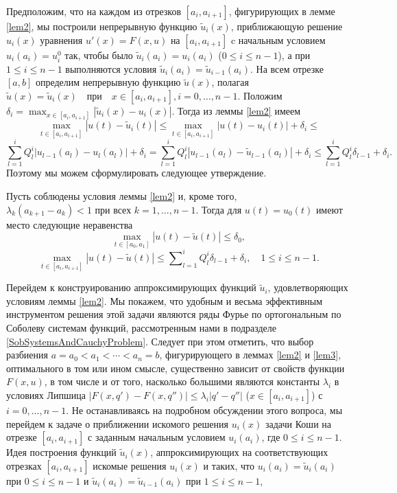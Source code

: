 Предположим, что на каждом из отрезков $[a_i,a_{i+1}]$, фигурирующих в лемме \ref{lem2}, мы построили непрерывную функцию $\tilde u_i(x)$,  приближающую решение $u_i(x)$ уравнения $u'(x)=F(x,u)$   на $[a_i,a_{i+1}]$  c начальным условием  $u_i(a_i)=u_i^0$ так, чтобы  было  $\tilde u_i(a_i)= u_i(a_i)$ ($0\le i\le n-1$), а при $1\le i\le n-1$ выполняются условия $\tilde u_i(a_i)=\tilde u_{i-1}(a_i)$.  На всем отрезке $[a,b]$ определим непрерывную функцию $\tilde u(x)$, полагая
$\tilde u(x)=\tilde u_i(x)\quad \text{при}\quad x\in [a_i,a_{i+1}], i=0,\ldots, n-1$.
Положим $\delta_i=\max_{x\in[a_i,a_{i+1}]}|\tilde u_i(x)- u_i(x)|$. Тогда из леммы \ref{lem2} имеем
$$
\max_{t\in[a_i,a_{i+1}]}|u(t)-\tilde u_i(t)|\le \max_{t\in[a_i,a_{i+1}]}|u(t)- u_i(t)|+\delta_i\le
$$
$$
\sum_{l=1}^{i}Q_{l}^{i}|u_{l-1}(a_{l})-u_{l}(a_l)|+\delta_i=
\sum_{l=1}^{i}Q_{l}^{i}|u_{l-1}(a_{l})-\tilde u_{l-1}(a_{l})| +\delta_i\le
\sum_{l=1}^{i}Q_{l}^{i}\delta_{l-1}+\delta_i.
$$
Поэтому мы можем сформулировать следующее утверждение.
\begin{lemma}\label{lem3}
	Пусть соблюдены условия леммы \ref{lem2}   и, кроме того,\\ $\lambda_{k}(a_{k+1}-a_k)<1$ при всех $k=1,\ldots,n-1$. Тогда для $u(t)=u_0(t)$  имеют место следующие неравенства
	$$
	\max_{t\in[a_0,a_1]}|u(t)-\tilde u(t)|\le \delta_0,
	$$
	$$
	\max_{t\in[a_i,a_{i+1}]}|u(t)-\tilde u(t)|\le\sum\nolimits_{l=1}^iQ_{l}^i\delta_{l-1}+\delta_i, \quad 1\le i\le n-1.
	$$
\end{lemma}
Перейдем к конструированию аппроксимирующих  функций $\tilde u_i$, удовлетворяющих условиям  леммы \ref{lem2}. Мы покажем, что удобным и весьма эффективным инструментом  решения этой задачи являются ряды Фурье по ортогональным по Соболеву системам функций, рассмотренным нами в подразделе \ref{SobSystemsAndCauchyProblem}. Следует при этом отметить, что выбор разбиения $a=a_0<a_1<\cdots<a_n=b$, фигурирующего в леммах \ref{lem2} и \ref{lem3}, оптимального в том или ином смысле, существенно зависит от свойств функции $F(x,u)$, в том числе  и от того, насколько большими являются константы $\lambda_i$ в условиях Липшица $|F(x,q')-F(x,q'')|\le\lambda_i|q'-q''|$ ($x\in [a_i,a_{i+1}]$) с $i=0,\ldots, n-1$. Не останавливаясь на подробном обсуждении этого вопроса, мы перейдем к задаче о приближении  искомого решения $u_i(x)$ задачи Коши на отрезке $[a_i,a_{i+1}]$ с заданным начальным условием $u_i(a_i)$, где $0\le i\le n-1$.
Идея построения функций $\tilde u_i(x)$, аппроксимирующих на соответствующих отрезках $[a_i,a_{i+1}]$ искомые  решения $u_i(x)$ и таких, что $u_i(a_i)=\tilde u_i(a_i)$ при $0\le i\le n-1$ и $\tilde u_i(a_i)= \tilde u_{i-1}(a_i)$ при $1\le i\le n-1$,
